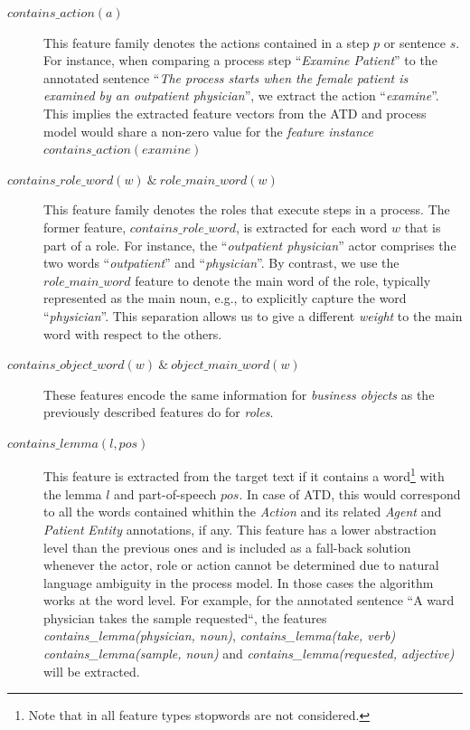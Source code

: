 \begin{description}
	    \item[$contains\_action(a)$]{This feature family denotes the actions
          contained in a step $p$ or sentence $s$. For instance, when comparing
          a process step ``\textit{Examine Patient}'' to the annotated sentence
          ``\textit{The process starts when the female patient is examined by an
            outpatient physician}'', we extract the action ``\textit{examine}''.
          This implies the extracted feature vectors from the ATD and process
          model would share a non-zero value for the \emph{feature instance}
          $contains\_action(examine)$}

        \item[$contains\_role\_word(w) ~\&~ role\_main\_word(w)$]{This feature
            family denotes the roles that execute steps in a process. The
            former feature, $contains\_role\_word$, is extracted for each word
            $w$ that is part of a role. For instance, the ``\textit{outpatient
            physician}'' actor comprises the two words ``\textit{outpatient}'' and
            ``\textit{physician}''. By contrast, we use the $role\_main\_word$
            feature to denote the main word of the role, typically represented
            as the main noun, e.g., to explicitly capture the word
            ``\textit{physician}''. This separation allows us to give a different
            \emph{weight} to the main word with respect to the others.}

       \item[$contains\_object\_word(w) ~\&~ object\_main\_word(w)$]{These
           features encode the same information for \textit{business objects} as
           the previously described features do for \textit{roles}.}

       \item[$contains\_lemma(l, pos)$]{This feature is extracted from the
           target text if it contains a word\footnote{Note that in all feature
             types stopwords are not considered.} with the lemma $l$ and
           part-of-speech $pos$. In case of ATD, this would correspond to all
           the words contained whithin the \emph{Action} and its related
           \emph{Agent} and \emph{Patient} \emph{Entity} annotations, if any.
           This feature has a lower abstraction level than
           the previous ones and is included as a fall-back solution
           whenever the actor, role or action cannot be determined due to
           natural language ambiguity in the process model. In those cases the
           algorithm works at the word level. For example, for the annotated
           sentence ``A ward physician takes the sample requested``, the
           features \textit{contains\_lemma(physician, noun)},
           \textit{contains\_lemma(take, verb)} \textit{contains\_lemma(sample,
             noun)} and \textit{contains\_lemma(requested, adjective)} will be
           extracted.}
         

\end{description}
